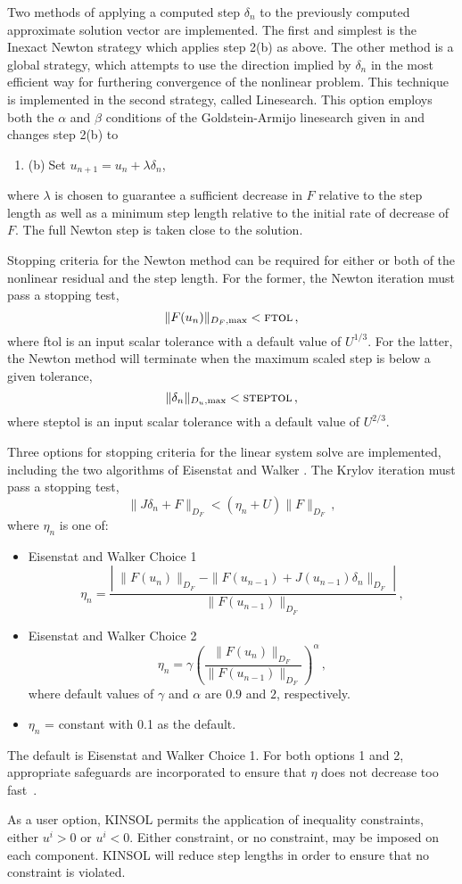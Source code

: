 Two methods of applying a computed step $\delta_n$ to the previously computed
approximate solution vector are implemented.  The 
first and simplest is the Inexact Newton strategy which applies step 2(b) 
as above.  
The other method is a global strategy,
which attempts to use the direction implied by $\delta_n$ 
in the most efficient way for furthering convergence of the nonlinear problem. 
This technique 
is implemented in the second strategy, called Linesearch.  This option
employs both the $\alpha$ and $\beta$ conditions of the Goldstein-Armijo
linesearch given in \cite{DeSc:96} and changes step 2(b) to
\begin{enumerate}
  \addtocounter{enumi}{1}
\item{(b)$\;$Set $u_{n+1} = u_n + \lambda \delta_n$},
\end{enumerate}
where $\lambda$ is chosen to guarantee a sufficient decrease in $F$ 
relative to the step length as well as a minimum step length relative 
to the initial rate of decrease of $F$.  The full Newton step is taken
close to the solution.

Stopping criteria for the Newton method can be required for either or 
both of the nonlinear residual and the step length.  For the former, 
the Newton iteration must pass a stopping test,
\[ \|F(u_n)\|_{D_F,\mbox{\scriptsize max}} < \mbox{\sc ftol} \, , \]
where {\sc ftol} is an input scalar tolerance with a default value of
$U^{1/3}$. 
For the latter, the Newton method will terminate when the maximum scaled step
is below a given tolerance,
\[ \|\delta_n\|_{D_u,\mbox{\scriptsize max}} < \mbox{\sc steptol} \, , \]
where {\sc steptol} is an input scalar tolerance with a default value of 
$U^{2/3}$.

Three options for stopping criteria for the linear system solve are
implemented, including the two 
algorithms of Eisenstat and Walker \cite{EiWa:96}.
The Krylov iteration must pass a stopping test,
\[ \|J \delta_n + F\|_{D_F} < (\eta_n + U) \|F\|_{D_F} \, , \]
where $\eta_n$ is one of:
\begin{itemize}
\item Eisenstat and Walker Choice 1
  \[ 
  \eta_n = \frac{\left|\; \|F(u_n)\|_{D_F}  
      - \|F(u_{n-1}) + J(u_{n-1}) \delta_n \|_{D_F} 
      \; \right|}
  {\|F(u_{n-1})\|_{D_F}} \, ,  
  \]
\item Eisenstat and Walker Choice 2
  \[ 
  \eta_n = \gamma 
  \left( \frac{ \|F(u_n)\|_{D_F}}{\|F(u_{n-1})\|_{D_F}} \right)^{\alpha} \, ,
  \] 
where default values of $\gamma$ and $\alpha$ are $0.9$ and $2$,
 respectively. 
\item  $\eta_n$ = constant with 0.1 as the default.
\end{itemize}
The default is Eisenstat and Walker Choice 1. For both options 1 and 2, 
appropriate safeguards are incorporated to ensure that $\eta$ does not 
decrease too fast~\cite{EiWa:96}.

As a user option, KINSOL permits the application of inequality
constraints, either $u^i > 0$ or $u^i < 0$.  Either constraint, or
no constraint, may be imposed on each component.  KINSOL will reduce 
step lengths in order to ensure that no constraint is violated.


